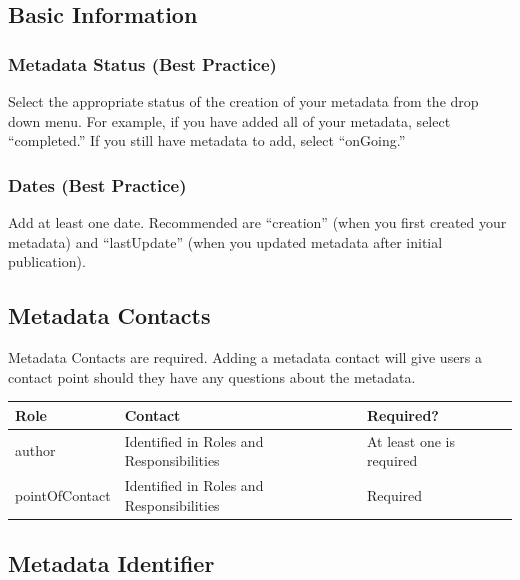 \documentclass[
]{book}
\begin{document}
\hypertarget{basic-information-3}{%
\subsection*{Basic Information}\label{basic-information-3}}

\hypertarget{metadata-status-best-practice-1}{%
\subsubsection*{Metadata Status (Best Practice)}\label{metadata-status-best-practice-1}}

Select the appropriate status of the creation of your metadata from the drop down menu. For example, if you have added all of your metadata, select ``completed.'' If you still have metadata to add, select ``onGoing.''

\hypertarget{dates-best-practice-2}{%
\subsubsection*{Dates (Best Practice)}\label{dates-best-practice-2}}

Add at least one date. Recommended are ``creation'' (when you first created your metadata) and ``lastUpdate'' (when you updated metadata after initial publication).

\hypertarget{metadata-contacts-1}{%
\subsection*{Metadata Contacts}\label{metadata-contacts-1}}

Metadata Contacts are required. Adding a metadata contact will give users a contact point should they have any questions about the metadata.

\begin{longtable}[]{@{}lll@{}}
\toprule
Role & Contact & Required?\tabularnewline
\midrule
\endhead
author & Identified in Roles and Responsibilities & At least one is required\tabularnewline
pointOfContact & Identified in Roles and Responsibilities & Required\tabularnewline
\bottomrule
\end{longtable}

\hypertarget{metadata-identifier-1}{%
\subsection*{Metadata Identifier}\label{metadata-identifier-1}}
\end{document}
